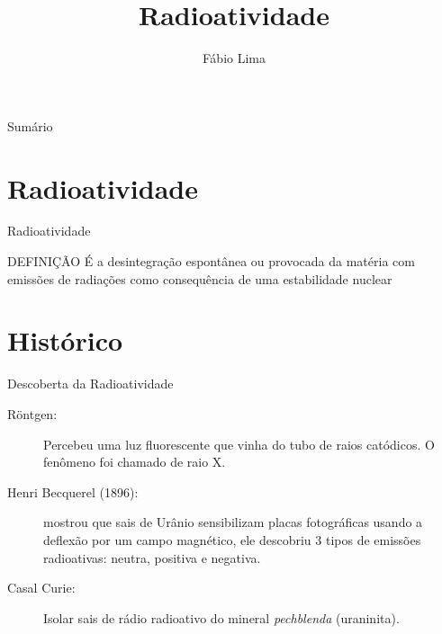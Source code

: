 \documentclass[presentation,professionalfonts,aspectratio=169]{beamer}
\date{}
\author{Fábio Lima}
\date{}
\title{ Radioatividade}
\begin{document}
\begingroup
  \maketitle
  \endgroup
\begin{frame}{Sumário}
\tableofcontents
\end{frame}


\section{Radioatividade}
\label{sec:org67918c2}

\begin{frame}[label={sec:org629c07f}]{Radioatividade}
\begin{bclogo}[logo=\bcdanger]{DEFINIÇÃO}
É a desintegração espontânea ou provocada da matéria com emissões de radiações como consequência de uma estabilidade nuclear
\end{bclogo}
\end{frame}


\section{Histórico}
\label{sec:org808f755}

\begin{frame}[label={sec:org921f294}]{Descoberta da Radioatividade}
\begin{description}
\item[{Röntgen:}] Percebeu uma luz fluorescente que vinha do tubo de raios catódicos. O fenômeno foi chamado de raio X.
\item[{Henri Becquerel (1896):}] mostrou que sais de Urânio sensibilizam placas fotográficas usando  a deflexão por um campo magnético, ele descobriu 3 tipos de emissões radioativas: \alert{neutra}, \alert{positiva} e \alert{negativa}.
\item[{Casal Curie:}] Isolar sais de rádio radioativo do mineral \emph{pechblenda} (uraninita).
\end{description}
\end{frame}
\end{document}
